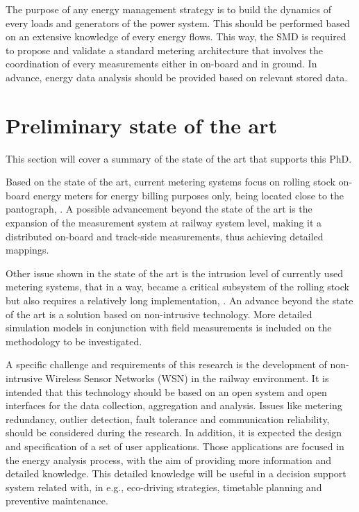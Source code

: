 The purpose of any energy management strategy is to build the dynamics of every loads and generators of the power system. 
This should be performed based on an extensive knowledge of every energy flows. 
This way, the SMD is required to propose and validate a standard metering architecture that involves the coordination of every measurements either in on-board and in ground. 
In advance, energy data analysis should be provided based on relevant stored data. 

\section{Preliminary state of the art}

This section will cover a summary of the state of the art that supports this PhD.

Based on the state of the art, current metering systems focus on rolling stock on-board energy meters for energy billing purposes only, being located close to the pantograph, \cite{shift2rail2015}.
A possible advancement beyond the state of the art is the expansion of the measurement system at railway system level, making it a distributed on-board and track-side measurements, thus achieving detailed mappings. 


Other issue shown in the state of the art is the intrusion level of currently used metering systems, that in a way, became a critical subsystem of the rolling stock but also requires a relatively long implementation, \cite{shift2rail2015}. 
An advance beyond the state of the art is a solution based on non-intrusive technology. More detailed simulation models in conjunction with field measurements is included on the methodology to be investigated.




A specific challenge and requirements of this research is the development of non-intrusive Wireless Sensor Networks (WSN)  in the railway environment. 
It is intended that this technology should be based on an open system and open interfaces for the data collection, aggregation and analysis. 
Issues like metering redundancy, outlier detection, fault tolerance and communication reliability, should be considered during the research.
In addition, it is expected the design and specification of a set of user applications.
Those applications are focused in the energy analysis process, with the aim of providing more information and detailed knowledge.
This detailed knowledge will be useful in a decision support system related with, in e.g., eco-driving strategies, timetable planning and preventive maintenance.

